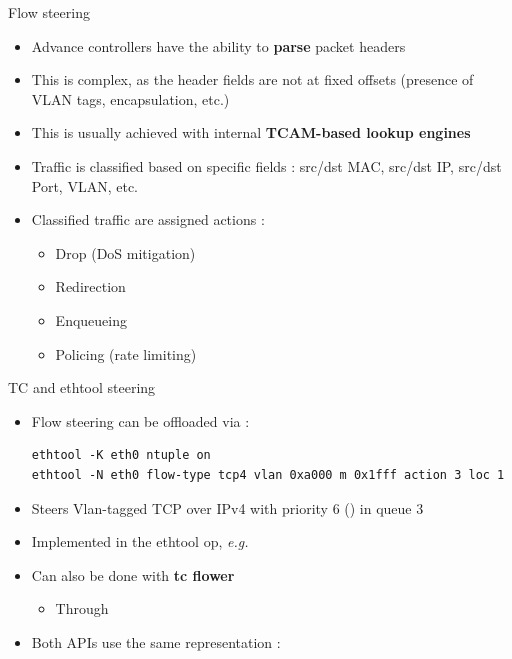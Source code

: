 \begin{frame}{Flow steering}
	\begin{itemize}
		\item Advance controllers have the ability to \textbf{parse} packet headers
		\item This is complex, as the header fields are not at fixed offsets (presence of VLAN tags, encapsulation, etc.)
		\item This is usually achieved with internal \textbf{TCAM-based lookup engines}
		\item Traffic is classified based on specific fields : src/dst MAC, src/dst IP, src/dst Port, VLAN, etc.
		\item Classified traffic are assigned actions :
			\begin{itemize}
				\item Drop (DoS mitigation)
				\item Redirection
				\item Enqueueing
				\item Policing (rate limiting)
			\end{itemize}
	\end{itemize}
\end{frame}

\begin{frame}[fragile]{TC and ethtool steering}
	\begin{itemize}
		\item Flow steering can be offloaded via  :
			\begin{verbatim}
ethtool -K eth0 ntuple on
ethtool -N eth0 flow-type tcp4 vlan 0xa000 m 0x1fff action 3 loc 1
			\end{verbatim}
		\item Steers Vlan-tagged TCP over IPv4 with priority 6 () in queue 3
		\item Implemented in the  ethtool op, \textit{e.g.} 
		\item Can also be done with \textbf{tc flower}
			\begin{itemize}
				\item Through 
			\end{itemize}
		\item Both APIs use the same representation : 
	\end{itemize}
\end{frame}

